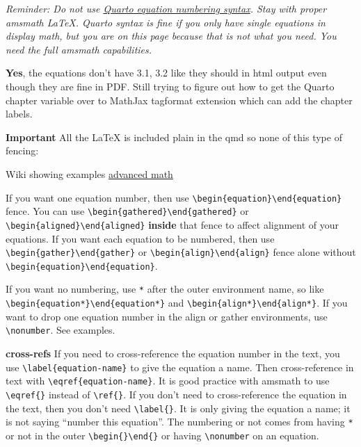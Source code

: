\documentclass[
  letterpaper,
  DIV=11,
  numbers=noendperiod]{scrreprt}
\begin{document}
\emph{Reminder: Do not use
\href{https://quarto.org/docs/authoring/cross-references.html\#equations}{Quarto
equation numbering syntax}. Stay with proper amsmath LaTeX. Quarto
syntax is fine if you only have single equations in display math, but
you are on this page because that is not what you need. You need the
full amsmath capabilities.}

\textbf{Yes}, the equations don't have 3.1, 3.2 like they should in html
output even though they are fine in PDF. Still trying to figure out how
to get the Quarto chapter variable over to MathJax tagformat extension
which can add the chapter labels.

\textbf{Important} All the LaTeX is included plain in the qmd so none of
this type of fencing:

Wiki showing examples
\href{https://en.wikibooks.org/wiki/LaTeX/Advanced_Mathematics\#Other_environments}{advanced
math}

If you want one equation number, then use
\texttt{\textbackslash{}begin\{equation\}\textbackslash{}end\{equation\}}
fence. You can use
\texttt{\textbackslash{}begin\{gathered\}\textbackslash{}end\{gathered\}}
or
\texttt{\textbackslash{}begin\{aligned\}\textbackslash{}end\{aligned\}}
\textbf{inside} that fence to affect alignment of your equations. If you
want each equation to be numbered, then use
\texttt{\textbackslash{}begin\{gather\}\textbackslash{}end\{gather\}} or
\texttt{\textbackslash{}begin\{align\}\textbackslash{}end\{align\}}
fence alone without
\texttt{\textbackslash{}begin\{equation\}\textbackslash{}end\{equation\}}.

If you want no numbering, use \texttt{*} after the outer environment
name, so like
\texttt{\textbackslash{}begin\{equation*\}\textbackslash{}end\{equation*\}}
and
\texttt{\textbackslash{}begin\{align*\}\textbackslash{}end\{align*\}}.
If you want to drop one equation number in the align or gather
environments, use \texttt{\textbackslash{}nonumber}. See examples.

\textbf{cross-refs} If you need to cross-reference the equation number
in the text, you use \texttt{\textbackslash{}label\{equation-name\}} to
give the equation a name. Then cross-reference in text with
\texttt{\textbackslash{}eqref\{equation-name\}}. It is good practice
with amsmath to use \texttt{\textbackslash{}eqref\{\}} instead of
\texttt{\textbackslash{}ref\{\}}. If you don't need to cross-reference
the equation in the text, then you don't need
\texttt{\textbackslash{}label\{\}}. It is only giving the equation a
name; it is not saying ``number this equation''. The numbering or not
comes from having \texttt{*} or not in the outer
\texttt{\textbackslash{}begin\{\}\textbackslash{}end\{\}} or having
\texttt{\textbackslash{}nonumber} on an equation.
\end{document}
